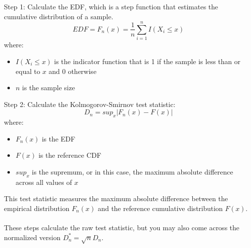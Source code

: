 \documentclass[preview]{standalone}
\begin{document}
Step 1: Calculate the EDF, which is a step function that estimates the cumulative distribution of a sample.
{\Large
\[
EDF=F_n(x)=\frac{1}{n}\sum^n_{i=1}I(X_i\le x)
\]
}
where:
\begin{itemize}
	\setlength\itemsep{0.1em}
	\item $I(X_i\le x)$ is the indicator function that is 1 if the sample is less than or equal to $x$ and 0 otherwise
	\item $n$ is the sample size
\end{itemize}
Step 2: Calculate the Kolmogorov-Smirnov test statistic:
{\Large
\[
D_n=sup_x|F_n(x)-F(x)|
\]
}
where:
\begin{itemize}
	\setlength\itemsep{0.1em}
	\item $F_n(x)$ is the EDF
	\item $F(x)$ is the reference CDF
	\item $sup_x$ is the supremum, or in this case, the maximum absolute difference across all values of $x$
\end{itemize}
This test statistic measures the maximum absolute difference between the empirical distribution $F_n(x)$ and the reference cumulative distribution $F(x)$.
\\\\
These steps calculate the raw test statistic, but you may also come across the normalized version $D^*_n=\sqrt{n}D_n$.
\end{document}
